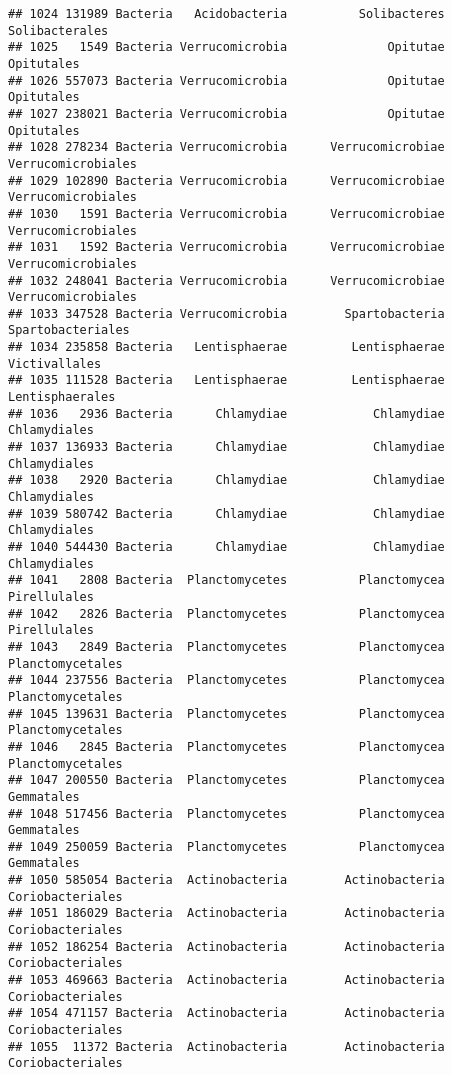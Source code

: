 \documentclass[
]{article}
\begin{document}
\begin{verbatim}
## 1024 131989 Bacteria   Acidobacteria          Solibacteres      Solibacterales
## 1025   1549 Bacteria Verrucomicrobia              Opitutae          Opitutales
## 1026 557073 Bacteria Verrucomicrobia              Opitutae          Opitutales
## 1027 238021 Bacteria Verrucomicrobia              Opitutae          Opitutales
## 1028 278234 Bacteria Verrucomicrobia      Verrucomicrobiae  Verrucomicrobiales
## 1029 102890 Bacteria Verrucomicrobia      Verrucomicrobiae  Verrucomicrobiales
## 1030   1591 Bacteria Verrucomicrobia      Verrucomicrobiae  Verrucomicrobiales
## 1031   1592 Bacteria Verrucomicrobia      Verrucomicrobiae  Verrucomicrobiales
## 1032 248041 Bacteria Verrucomicrobia      Verrucomicrobiae  Verrucomicrobiales
## 1033 347528 Bacteria Verrucomicrobia        Spartobacteria   Spartobacteriales
## 1034 235858 Bacteria   Lentisphaerae         Lentisphaerae       Victivallales
## 1035 111528 Bacteria   Lentisphaerae         Lentisphaerae     Lentisphaerales
## 1036   2936 Bacteria      Chlamydiae            Chlamydiae        Chlamydiales
## 1037 136933 Bacteria      Chlamydiae            Chlamydiae        Chlamydiales
## 1038   2920 Bacteria      Chlamydiae            Chlamydiae        Chlamydiales
## 1039 580742 Bacteria      Chlamydiae            Chlamydiae        Chlamydiales
## 1040 544430 Bacteria      Chlamydiae            Chlamydiae        Chlamydiales
## 1041   2808 Bacteria  Planctomycetes          Planctomycea        Pirellulales
## 1042   2826 Bacteria  Planctomycetes          Planctomycea        Pirellulales
## 1043   2849 Bacteria  Planctomycetes          Planctomycea    Planctomycetales
## 1044 237556 Bacteria  Planctomycetes          Planctomycea    Planctomycetales
## 1045 139631 Bacteria  Planctomycetes          Planctomycea    Planctomycetales
## 1046   2845 Bacteria  Planctomycetes          Planctomycea    Planctomycetales
## 1047 200550 Bacteria  Planctomycetes          Planctomycea          Gemmatales
## 1048 517456 Bacteria  Planctomycetes          Planctomycea          Gemmatales
## 1049 250059 Bacteria  Planctomycetes          Planctomycea          Gemmatales
## 1050 585054 Bacteria  Actinobacteria        Actinobacteria    Coriobacteriales
## 1051 186029 Bacteria  Actinobacteria        Actinobacteria    Coriobacteriales
## 1052 186254 Bacteria  Actinobacteria        Actinobacteria    Coriobacteriales
## 1053 469663 Bacteria  Actinobacteria        Actinobacteria    Coriobacteriales
## 1054 471157 Bacteria  Actinobacteria        Actinobacteria    Coriobacteriales
## 1055  11372 Bacteria  Actinobacteria        Actinobacteria    Coriobacteriales

\end{verbatim}
\end{document}
